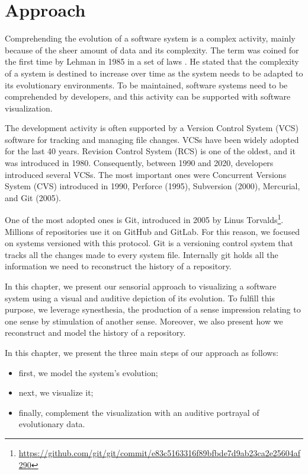 
\chapter[Approach]{Approach}
\graphicspath{ {images/approach} }

Comprehending the evolution of a software system is a complex activity, mainly because of the sheer amount of data and its complexity. 
The term  was coined for the first time by Lehman in 1985 in a set of laws \cite{Lehman1985}.
He stated that the complexity of a system is destined to increase over time as the system needs to be adapted to its evolutionary environments. 
To be maintained, software systems need to be comprehended by developers, and this activity can be supported with software visualization. 

The development activity is often supported by a Version Control System (VCS) software for tracking and managing file changes. VCSs have been widely adopted for the last 40 years. Revision Control System (RCS) is one of the oldest, and it was introduced in 1980. Consequently, between 1990 and 2020, developers introduced several VCSs. The most important ones were Concurrent Versions System (CVS) introduced in 1990, Perforce (1995), Subversion (2000), Mercurial, and Git (2005).

One of the most adopted ones is Git, introduced in 2005 by Linus Torvalds\footnote{\url{https://github.com/git/git/commit/e83c5163316f89bfbde7d9ab23ca2e25604af290}}. Millions of repositories use it on GitHub and GitLab. 
For this reason, we focused on systems versioned with this protocol.
Git is a versioning control system that tracks all the changes made to every system file. 
Internally git holds all the information we need to reconstruct the history of a repository. 

In this chapter, we present our sensorial approach to visualizing a software system using a visual and auditive depiction of its evolution. 
To fulfill this purpose, we leverage synesthesia, the production of a sense impression relating to one sense by stimulation of another sense.
Moreover, we also present how we reconstruct and model the history of a repository. 

In this chapter, we present the three main steps of our approach as follows:
\begin{itemize}
    \item first, we model the system's evolution; 
    \item next, we visualize it;
    \item finally, complement the visualization with an auditive portrayal of evolutionary data. 
\end{itemize}

